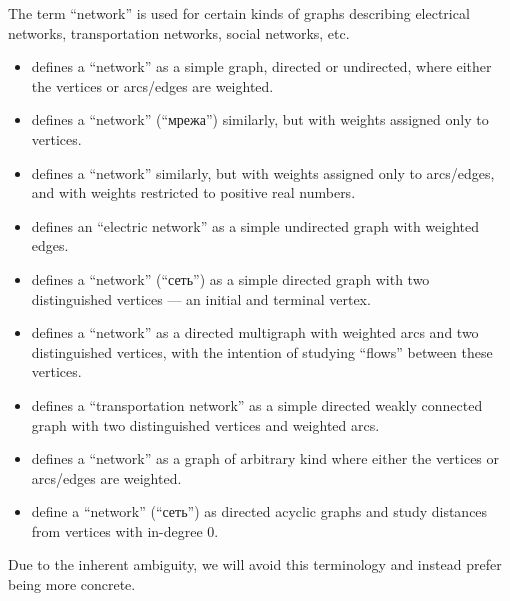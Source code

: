 \begin{remark}\label{rem:networks}
  The term \enquote{network} is used for certain kinds of graphs describing electrical networks, transportation networks, social networks, etc.

  \begin{itemize}
    \item {} defines a \enquote{network} as a simple graph, directed or undirected, where either the vertices or arcs/edges are weighted.

    \item {} defines a \enquote{network} (\enquote{мрежа}) similarly, but with weights assigned only to vertices.

    \item {} defines a \enquote{network} similarly, but with weights assigned only to arcs/edges, and with weights restricted to positive real numbers.

    \item {} defines an \enquote{electric network} as a simple undirected graph with weighted edges.

    \item {} defines a \enquote{network} (\enquote{сеть}) as a simple directed graph with two distinguished vertices --- an initial and terminal vertex.

    \item {} defines a \enquote{network} as a directed multigraph with weighted arcs and two distinguished vertices, with the intention of studying \enquote{flows} between these vertices.

    \item {} defines a \enquote{transportation network} as a simple directed weakly connected graph with two distinguished vertices and weighted arcs.

    \item {} defines a \enquote{network} as a graph of arbitrary kind where either the vertices or arcs/edges are weighted.

    \item {} define a \enquote{network} (\enquote{сеть}) as directed acyclic graphs and study distances from vertices with in-degree \( 0 \).
  \end{itemize}

  Due to the inherent ambiguity, we will avoid this terminology and instead prefer being more concrete.
\end{remark}

